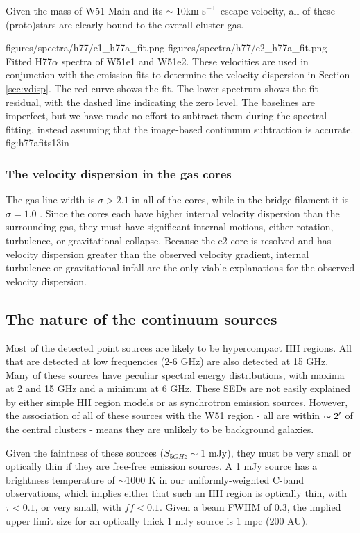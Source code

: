 Given the mass of W51 Main and its $\sim10\textrm{km~s}^{-1}$ escape velocity, all of these
(proto)stars are clearly bound to the overall cluster gas. 

\FigureTwo
{figures/spectra/h77/e1_h77a_fit.png}
{figures/spectra/h77/e2_h77a_fit.png}
{Fitted H77$\alpha$ spectra of W51e1 and W51e2.  These velocities are used in
conjunction with the \formaldehyde emission fits to determine the velocity
dispersion in Section \ref{sec:vdisp}.
The red curve shows the fit.  The lower spectrum shows the fit residual, with
the dashed line indicating the zero level.  The baselines are imperfect, but we
have made no effort to subtract them during the spectral fitting, instead
assuming that the image-based continuum subtraction is accurate.
}
{fig:h77afits}{1}{3in}

\subsubsection{The velocity dispersion in the gas cores}
The gas line width is $\sigma>2.1$ \kms in all of the cores, while in the
bridge filament it is $\sigma=1.0$ \kms.  Since the cores each have higher
internal velocity dispersion than the surrounding gas, they must have
significant internal motions, either rotation, turbulence, or gravitational
collapse.  Because the e2 core is resolved and has velocity dispersion greater
than the observed velocity gradient, internal turbulence or gravitational
infall are the only viable explanations for the observed velocity dispersion.

\subsection{The nature of the continuum sources}
Most of the detected point sources are likely to be hypercompact HII regions.
All that are detected at low frequencies (2-6 GHz) are also detected at 15 GHz.
Many of these sources have peculiar spectral energy distributions, with maxima
at 2 and 15 GHz and a minimum at 6 GHz.  These SEDs are not easily explained by
either simple HII region models or as synchrotron emission sources.  However,
the association of all of these sources with the W51 region - all are within
$\sim2\mbox{$^\prime$}$ of the central clusters - means they are unlikely to be
background galaxies.  

Given the faintness of these sources ($S_{5 GHz} \sim 1$ mJy), they must be
very small or optically thin if they are free-free emission sources.  A 1 mJy
source has a brightness temperature of $\sim$1000 K in our uniformly-weighted
C-band observations, which implies either that such an HII region is optically
thin, with $\tau < 0.1$, or very small, with $ff<0.1$.  Given a beam FWHM of
0.3\arcsec, the implied upper limit size for an optically thick 1 mJy source is
1 mpc (200 AU).

